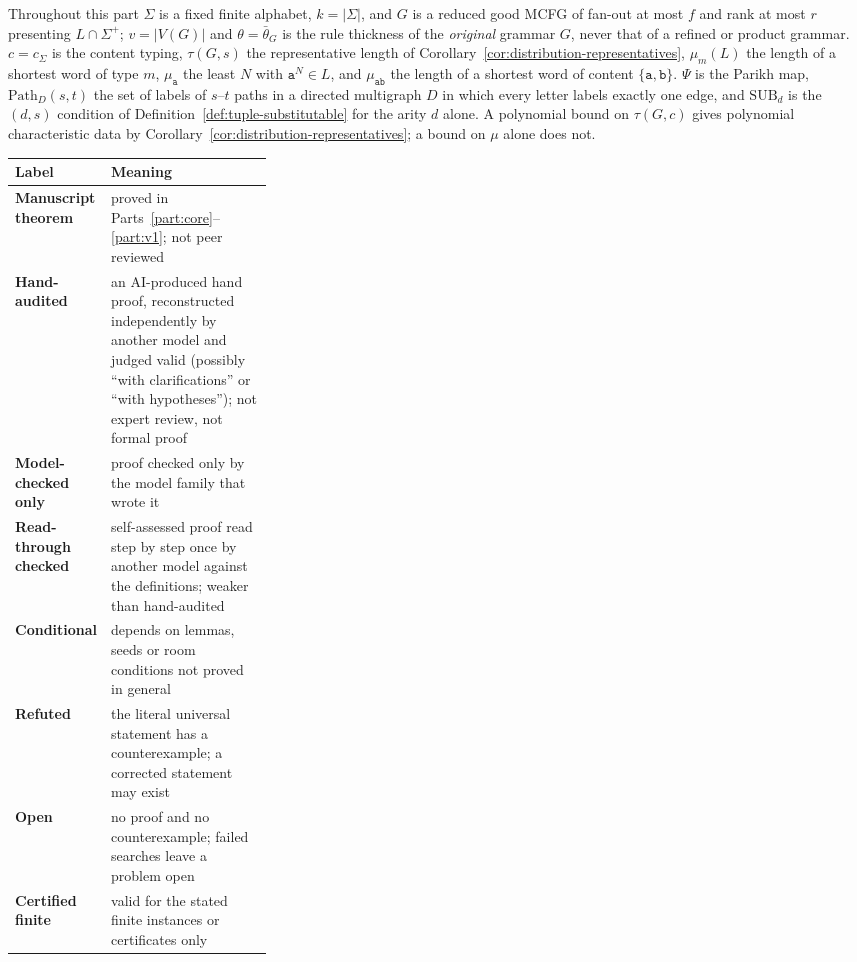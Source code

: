 \documentclass[11pt]{article}
\numberwithin{equation}{section}
\theoremstyle{plain}
\theoremstyle{definition}
\theoremstyle{remark}
\theoremstyle{plain}
\begin{document}
Throughout this part $\Sigma$ is a fixed finite alphabet, $k=|\Sigma|$, and $G$ is a
reduced good MCFG of fan-out at most $f$ and rank at most $r$ presenting
$L\cap\Sigma^+$; $v=|V(G)|$ and $\theta=\bar\theta_G$ is the rule thickness of the
\emph{original} grammar $G$, never that of a refined or product grammar.
$c=c_\Sigma$ is the content typing, $\tau(G,s)$ the representative length of
Corollary~\ref{cor:distribution-representatives}, $\mu_m(L)$ the length of a shortest
word of type $m$, $\mu_{\mathtt a}$ the least $N$ with $\mathtt a^N\in L$, and
$\mu_{\mathtt{ab}}$ the length of a shortest word of content $\{\mathtt a,\mathtt b\}$.
$\Psi$ is the Parikh map, $\mathrm{Path}_D(s,t)$ the set of labels of $s$--$t$ paths in
a directed multigraph $D$ in which every letter labels exactly one edge, and
$\mathrm{SUB}_d$ is the $(d,s)$ condition of Definition~\ref{def:tuple-substitutable}
for the arity $d$ alone.  A polynomial bound on $\tau(G,c)$ gives polynomial
characteristic data by Corollary~\ref{cor:distribution-representatives}; a bound on
$\mu$ alone does not.

\begin{center}
\footnotesize
\begin{tabularx}{\linewidth}{@{}>{\bfseries}p{0.3\linewidth}X@{}}
\hline
Label & Meaning\\
\hline
Manuscript theorem & proved in Parts~\ref{part:core}--\ref{part:v1}; not peer reviewed\\
Hand-audited & an AI-produced hand proof, reconstructed independently by another model and judged valid (possibly ``with clarifications'' or ``with hypotheses''); not expert review, not formal proof\\
Model-checked only & proof checked only by the model family that wrote it\\
Read-through checked & self-assessed proof read step by step once by another model against the definitions; weaker than hand-audited\\
Conditional & depends on lemmas, seeds or room conditions not proved in general\\
Refuted & the literal universal statement has a counterexample; a corrected statement may exist\\
Open & no proof and no counterexample; failed searches leave a problem open\\
Certified finite & valid for the stated finite instances or certificates only\\
\hline
\end{tabularx}
\end{center}
\end{document}
